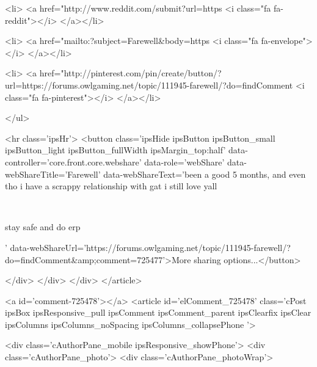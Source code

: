 			<li>
<a href="http://www.reddit.com/submit?url=https%
	<i class="fa fa-reddit"></i>
</a></li>
		
			<li>
<a href="mailto:?subject=Farewell&body=https%
	<i class="fa fa-envelope"></i>
</a></li>
		
			<li>
<a href="http://pinterest.com/pin/create/button/?url=https://forums.owlgaming.net/topic/111945-farewell/?do=findComment%
	<i class="fa fa-pinterest"></i>
</a></li>
		
	</ul>


	<hr class='ipsHr'>
	<button class='ipsHide ipsButton ipsButton_small ipsButton_light ipsButton_fullWidth ipsMargin_top:half' data-controller='core.front.core.webshare' data-role='webShare' data-webShareTitle='Farewell' data-webShareText='been a good 5 months, and even tho i have a scrappy relationship with gat i still love yall
 


	 
 


	stay safe and do erp
 
' data-webShareUrl='https://forums.owlgaming.net/topic/111945-farewell/?do=findComment&amp;comment=725477'>More sharing options...</button>

	
</div>
</div>
	</div>
</article>
					
				
					
					
					



<a id='comment-725478'></a>
<article  id='elComment_725478' class='cPost ipsBox ipsResponsive_pull  ipsComment  ipsComment_parent ipsClearfix ipsClear ipsColumns ipsColumns_noSpacing ipsColumns_collapsePhone    '>
	

	

	<div class='cAuthorPane_mobile ipsResponsive_showPhone'>
		<div class='cAuthorPane_photo'>
			<div class='cAuthorPane_photoWrap'>
				


